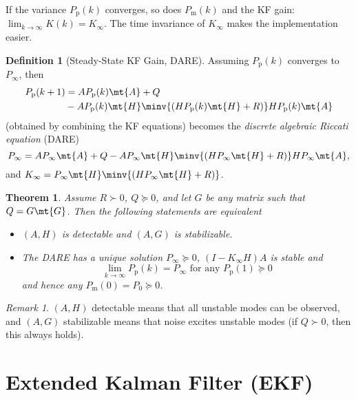 \documentclass[]{hsrzf}
\theoremstyle{plain}
\newtheorem{thm}{Theorem}[section]
\theoremstyle{definition}
\newtheorem{defn}{Definition}[section]
\theoremstyle{remark}
\newtheorem*{remark}{Remark}
\begin{document}
If the variance $P_\mathrm{p}(k)$ converges, so does $P_\mathrm{m}(k)$ and the
KF gain: $\lim_{k\to\infty} K(k) = K_\infty$. The time invariance of
$K_\infty$ makes the implementation easier.

\begin{defn}[Steady-State KF Gain, DARE]
  \label{def:steady-state-kf-gain-dare}
  Assuming $P_\mathrm{p}(k)$ converges to $P_\infty$, then
  \begin{align*}
    P_\mathrm{p}(k+1) &= A P_\mathrm{p}(k) \mt{A} + Q \\
      &- A P_\mathrm{p}(k)
      \mt{H} \minv{( H P_\mathrm{p}(k) \mt{H} + R)} H P_\mathrm{p}(k) \mt{A}
  \end{align*}
  (obtained by combining the KF equations) becomes the \emph{discrete
  algebraic Riccati equation} (DARE)
  \[
    P_\infty = A P_\infty \mt{A} + Q - A P_\infty \mt{H}
      \minv{(H P_\infty \mt{H} + R)} H P_\infty \mt{A},
  \]
  and $K_\infty = P_\infty \mt{H}\minv{(H P_\infty \mt{H} + R)}$.
\end{defn}


\begin{thm}
  Assume $R \succ 0$, $Q \succeq 0$, and let $G$ be any matrix such that $Q =
  G\mt{G}$. Then the following statements are equivalent
  \begin{itemize}
    \item $(A, H)$ is detectable and $(A, G)$ is stabilizable.
    \item The DARE has a unique solution $P_\infty \succeq 0$, $(I - K_\infty
      H)A$ is stable and
      \[
        \lim_{k\to\infty} P_\mathrm{p}(k) = P_\infty
        \text{ for any } P_\mathrm{p}(1) \succeq 0
      \]
      and hence any $P_\mathrm{m}(0) = P_0 \succeq 0$.
  \end{itemize}
\end{thm}

\begin{remark}
  $(A,H)$ detectable means that all unstable modes can be observed, and
  $(A,G)$ stabilizable means that noise excites unstable modes (if $Q \succ 0$, then
  this always holds).
\end{remark}

\section{Extended Kalman Filter (EKF)}
\end{document}
